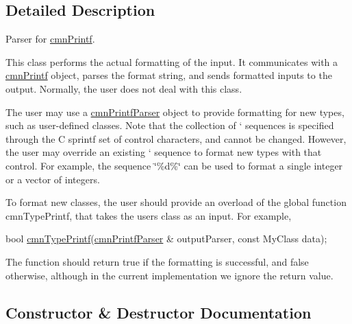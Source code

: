 \subsection{Detailed Description}
Parser for \hyperlink{classcmn_printf}{cmn\+Printf}. 

This class performs the actual formatting of the input. It communicates with a \hyperlink{classcmn_printf}{cmn\+Printf} object, parses the format string, and sends formatted inputs to the output. Normally, the user does not deal with this class.

The user may use a \hyperlink{classcmn_printf_parser}{cmn\+Printf\+Parser} object to provide formatting for new types, such as user-\/defined classes. Note that the collection of `\textquotesingle{} sequences is specified through the C sprintf set of control characters, and cannot be changed. However, the user may override an existing `\textquotesingle{} sequence to format new types with that control. For example, the sequence \char`\"{}\%d\%\char`\"{} can be used to format a single integer or a vector of integers.

To format new classes, the user should provide an overload of the global function cmn\+Type\+Printf, that takes the user\textquotesingle{}s class as an input. For example,


\begin{DoxyCode}
\textcolor{keywordtype}{bool} \hyperlink{cmn_printf_8h_ac406128072d3288a2fcb8654c6210b3b}{cmnTypePrintf}(\hyperlink{classcmn_printf_parser}{cmnPrintfParser} & outputParser, \textcolor{keyword}{const} MyClass data);
\end{DoxyCode}


The function should return true if the formatting is successful, and false otherwise, although in the current implementation we ignore the return value. 

\subsection{Constructor \& Destructor Documentation}
\hypertarget{classcmn_printf_parser_ac1b7a21e87f67c2794d96b6396684605}{}
